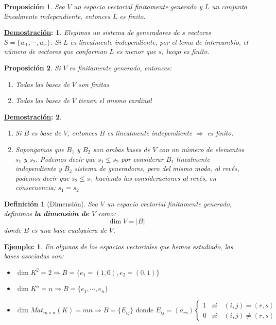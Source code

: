\documentclass[10pt,a4paper,openright]{book}
\theoremstyle{break}
\newtheorem*{defi}{Definición}
\newtheorem*{prop}{Proposición}
\newtheorem*{demo}{\underline{Demostración}:}
\newtheorem*{ej}{\underline{Ejemplo}:}
\begin{document}
\begin{prop}
Sea $V$ un espacio vectorial finitamente generado y $L$ un conjunto linealmente independiente, entonces $L$ es finito.
\end{prop}
\begin{demo}
Elegimos un sistema de generadores de $s$ vectores $S=\{w_1, \cdots, w_s\}$. Si $L$ es linealmente independiente, por el lema de intercambio, el número de vectores que conforman $L$ es menor que $s$, luego es finito.
\end{demo}

\begin{prop}
Si $V$ es finitamente generado, entonces:
\begin{enumerate}
\item Todas las bases de $V$ son finitas
\item Todas las bases de $V$ tienen el mismo cardinal
\end{enumerate}
\end{prop}
\begin{demo}
\begin{enumerate}
\item Si $B$ es base de $V$, entonces $B$ es linealmente independiente $\Rightarrow$ es finito.

\item Supongamos que $B_1$ y $B_2$ son ambas bases de $V$ con un número de elementos $s_1$ y $s_2$. Podemos decir que $s_1\leq s_2$ por considerar $B_1$ linealmente independiente y $B_2$ sistema de generadores, pero del mismo modo, al revés, podemos decir que $s_2\leq s_1$ haciendo las consideraciones al revés, en consecuencia: $s_1=s_2$
\end{enumerate}
\end{demo}

\begin{defi}[Dimensión]
Sea $V$ un espacio vectorial finitamente generado, definimos \textbf{la dimensión de $V$} como:
$$
\dim V=|B|
$$
donde $B$ es una base cualquiera de $V$.
\end{defi}

\begin{ej}
En algunos de los espacios vectoriales que hemos estudiado, las bases asociadas son:
\begin{itemize}
\item $\dim K^2=2 \Rightarrow B=\{e_1=(1,0), e_2=(0,1)\}$
\item $\dim K^n=n \Rightarrow B=\{e_1, \cdots, e_n\}$
\item $\dim Mat_{m\times n}(K)=mn \Rightarrow B=\{E_{ij}\} \mbox{ donde } E_{ij}=(a_{rs})\begin{cases}
1 & si \quad (i,j)=(r,s) \\
0 & si \quad(i,j)\neq (r,s)
\end{cases}$
\end{itemize}
\end{ej}
\end{document}
